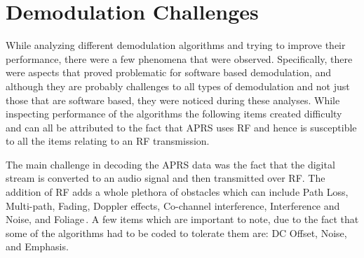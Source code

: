\chapter{Demodulation Challenges}
While analyzing different demodulation algorithms and trying to improve their performance, there were a few phenomena that were observed. Specifically, there were aspects that proved problematic for software based demodulation, and although they are probably challenges to all types of demodulation and not just those that are software based, they were noticed during these analyses. While inspecting performance of the algorithms the following items created difficulty and can all be attributed to the fact that APRS uses RF and hence is susceptible to all the items relating to an RF transmission. 

The main challenge in decoding the APRS data was the fact that the digital stream is converted to an audio signal and then transmitted over RF. The addition of RF adds a whole plethora of obstacles which can include Path Loss, Multi-path, Fading, Doppler effects, Co-channel interference, Interference and Noise, and Foliage\,\cite{Goleniewski2006}. A few items which are important to note, due to the fact that some of the algorithms had to be coded to tolerate them are: DC Offset, Noise, and Emphasis.

